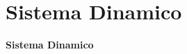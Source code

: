 \documentclass[aspectratio=169]{beamer} %
\begin{document}





\section{Sistema Dinamico}

\begin{frame}
    \vfill
    \centering
    {\Huge \textbf{Sistema Dinamico}}
    \vfill
\end{frame}
\end{document}

